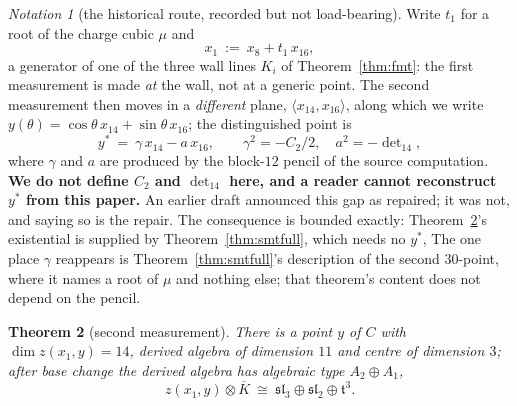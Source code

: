 \documentclass[11pt,reqno]{amsart}
\theoremstyle{plain}
\newtheorem{theorem}{Theorem}[section]
\theoremstyle{definition}
\theoremstyle{remark}
\newtheorem{notation}[theorem]{Notation}
\newcommand{\sll}{\mathfrak{sl}}
\begin{document}
\begin{notation}[the historical route, recorded but not load-bearing]\label{not:points}
Write $t_1$ for a root of the charge cubic $\mu$ and
\[
   x_1\ :=\ x_8+t_1\,x_{16},
\]
a generator of one of the three wall lines $K_i$ of Theorem~\ref{thm:fmt}: the first
measurement is made \emph{at} the wall, not at a generic point. The second measurement
then moves in a \emph{different} plane, $\langle x_{14},x_{16}\rangle$, along which we
write $y(\theta)=\cos\theta\,x_{14}+\sin\theta\,x_{16}$; the distinguished point is
\[
   y^*\ =\ \gamma\,x_{14}-a\,x_{16},\qquad \gamma^2=-C_2/2,\quad a^2=-\det\nolimits_{14},
\]
where $\gamma$ and $a$ are produced by the block-$12$ pencil of the source computation.
\textbf{We do not define $C_2$ and $\det_{14}$ here, and a reader cannot reconstruct
$y^*$ from this paper.} An earlier draft announced this gap as repaired; it was not, and
saying so is the repair. The consequence is bounded exactly:
Theorem~\ref{thm:smt}'s existential is supplied by Theorem~\ref{thm:smtfull}, which needs
no $y^*$, The one place $\gamma$ reappears is
Theorem~\ref{thm:smtfull}'s description of the second $30$-point, where it names a root
of $\mu$ and nothing else; that theorem's content does not depend on the pencil.
\end{notation}

\begin{theorem}[second measurement]\label{thm:smt}
There is a point $y$ of $C$ with $\dim z(x_1,y)=14$, derived algebra of
dimension $11$ and centre of dimension $3$; after base change the derived algebra has
algebraic type $A_2\oplus A_1$,
\[
   z(x_1,y)\otimes\overline K\ \cong\ \sll_3\oplus\sll_2\oplus\mathfrak t^{3}.
\]
\end{theorem}
\end{document}
